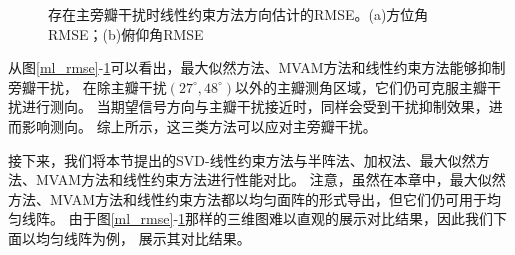 \documentclass[master]{thesis-uestc}
\begin{document}
\begin{figure}[H]
    \caption{存在主旁瓣干扰时线性约束方法方向估计的RMSE。(a)方位角RMSE；(b)俯仰角RMSE}
    \label{jlc_rmse}
\end{figure}

从图\ref{ml_rmse}-\ref{jlc_rmse}可以看出，最大似然方法、MVAM方法和线性约束方法能够抑制旁瓣干扰，
在除主瓣干扰$(27^\circ,48^\circ)$以外的主瓣测角区域，它们仍可克服主瓣干扰进行测向。
当期望信号方向与主瓣干扰接近时，同样会受到干扰抑制效果，进而影响测向。
综上所示，这三类方法可以应对主旁瓣干扰。

接下来，我们将本节提出的SVD-线性约束方法与半阵法、加权法、最大似然方法、MVAM方法和线性约束方法进行性能对比。
注意，虽然在本章中，最大似然方法、MVAM方法和线性约束方法都以均匀面阵的形式导出，但它们仍可用于均匀线阵。
由于图\ref{ml_rmse}-\ref{jlc_rmse}那样的三维图难以直观的展示对比结果，因此我们下面以均匀线阵为例，
展示其对比结果。
\end{document}
